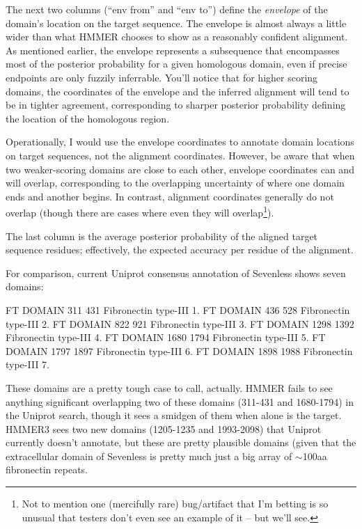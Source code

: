 The next two columns (``env from'' and ``env to'') define the
\emph{envelope} of the domain's location on the target sequence.  The
envelope is almost always a little wider than what HMMER chooses to
show as a reasonably confident alignment. As mentioned earlier, the
envelope represents a subsequence that encompasses most of the
posterior probability for a given homologous domain, even if precise
endpoints are only fuzzily inferrable. You'll notice that for higher
scoring domains, the coordinates of the envelope and the inferred
alignment will tend to be in tighter agreement, corresponding to
sharper posterior probability defining the location of the homologous
region. 

Operationally, I would use the envelope coordinates to annotate domain
locations on target sequences, not the alignment coordinates. However,
be aware that when two weaker-scoring domains are close to each other,
envelope coordinates can and will overlap, corresponding to the
overlapping uncertainty of where one domain ends and another begins.
In contrast, alignment coordinates generally do not overlap (though
there are cases where even they will overlap\footnote{Not to mention
  one (mercifully rare) bug/artifact that I'm betting is so unusual
  that testers don't even see an example of it -- but we'll
  see.}).

The last column is the average posterior probability of the aligned
target sequence residues; effectively, the expected accuracy per
residue of the alignment.

For comparison, current Uniprot consensus annotation of Sevenless
shows seven domains:

\begin{sreoutput}
FT   DOMAIN      311    431       Fibronectin type-III 1.
FT   DOMAIN      436    528       Fibronectin type-III 2.
FT   DOMAIN      822    921       Fibronectin type-III 3.
FT   DOMAIN     1298   1392       Fibronectin type-III 4.
FT   DOMAIN     1680   1794       Fibronectin type-III 5.
FT   DOMAIN     1797   1897       Fibronectin type-III 6.
FT   DOMAIN     1898   1988       Fibronectin type-III 7.
\end{sreoutput}

These domains are a pretty tough case to call, actually. HMMER fails
to see anything significant overlapping two of these domains (311-431
and 1680-1794) in the Uniprot search, though it sees a smidgen of them
when  alone is the target. HMMER3 sees two new
domains (1205-1235 and 1993-2098) that Uniprot currently doesn't
annotate, but these are pretty plausible domains (given that the
extracellular domain of Sevenless is pretty much just a big array of
$\sim$100aa fibronectin repeats.

